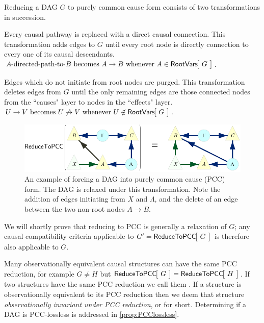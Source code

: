 Reducing a DAG $G$ to purely common cause form consists of two transformations in succession.
\begin{compactenum}
\item Every causal pathway is replaced with a direct causal connection. This transformation adds edges to $G$ until every root node is directly connection to every one of its causal descendants.\\ ${A\text{-directed-path-to-}B \text{ becomes } A \to B \text{ whenever } A\in \NamedFunction{RootVars}{\!G\!}}$.
\item Edges which do not initiate from root nodes are purged. This transformation deletes edges from $G$ until the only remaining edges are those connected nodes from the ``causes" layer to nodes in the ``effects" layer. \\ ${U \to V \text{ becomes } U \not\to V \text{ whenever } U\not\in \NamedFunction{RootVars}{\!G\!}}$.
\end{compactenum}

\begin{figure}[H]
\centering
\includegraphics[scale=1]{ExampleToPCCnodel.pdf}
\caption{An example of forcing a DAG into purely common cause (PCC) form. The DAG is relaxed under this transformation. Note the addition of edges initiating from $X$ and $\Lambda$, and the delete of an edge between the two non-root nodes $A\to B$.}\label{fig:ExampleToPCC}
\end{figure}

We will shortly prove that reducing to PCC is generally a relaxation of $G$; any causal compatibility criteria applicable to $G'=\NamedFunction{ReduceToPCC}{\!G\!}$ is therefore also applicable to $G$. 

Many observationally equivalent causal structures can have the same PCC reduction, for example $G\neq 
H$ but $\NamedFunction{ReduceToPCC}{\!G\!}= \NamedFunction{ReduceToPCC}{\!H\!}$. If two structures have the same PCC reduction we call them . If a structure is observationally equivalent to its PCC reduction then we deem that structure \emph{observationally invariant under PCC reduction}, or  for short. Determining if a DAG is PCC-lossless is addressed in \cref{prop:PCClossless}.

